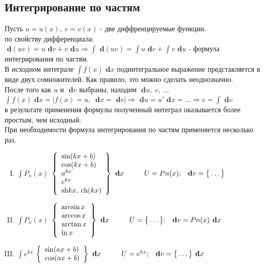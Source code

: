 \documentclass[a4paper,12pt, centered]{bookest}
\theoremstyle{remark}
\newcommand\tab[1][1cm]{\hspace*{#1}}
\newcommand\dx{\textbf{ d}x}
\newcommand\dy{\textbf{ d}}
\begin{document}
\subsection{Интегрирование по частям}
Пусть $u=u(x),\>v=v(x)$ - две диффренцируемые функции. \\
по свойству дифференциала:\\$\dy(uv)=u\dy v+v\dy u\Rightarrow\int \dy (uv)=\int u\dy v+\int v\dy u$ - формула интегрирования по частям.\\
В исходном интеграле $\int f(x)\dx$ подинтегральное выражение представляется в виде двух сомножителей. Как правило, это можно сделать неоднозначно.\\
После того как $u$ и $\dy v$ выбраны, находим $\dy u ,\>v,\>...$\\
$\int f(x)\dx = |f(x)=u,\>\dx=\dy v|\Rightarrow \dy u=u'\dx=...\Rightarrow v=\int \dy v$ \\
в результате применения формулы полученный интеграл оказывается более простым, чем исходный.\\
При необходимости формула интегрирования по частям применяется несколько раз.
\begin{enumerate}[I.]
	\item $\int P_n(x)$
		$\left\{\begin{array}{lr}
        \sin(kx+b)\\ \cos(kx+b)\\a^{kx}\\e^{kx}\\\textrm{sh}kx,\>\textrm{ch}(kx)
        \end{array}\right\}\dx\tab U=Pn(x);\>\>\dy v=\big\{\dots\big\}$
        \item $\int P_n(x)$
		$\left\{\begin{array}{lr}
        \arcsin x\\ \arccos x\\\arctan x\\\ln x\\
        \end{array}\right\}\dx\tab U=\big\{\dots\big\};\>\>\dy v=Pn(x)\dx$
        \item $\int e^{kx}$
		$\left\{\begin{array}{lr}
        \sin (ax+b)\\ \cos (ax+b)\end{array}\right\}\dx\tab U=e^{kx};\>\>\dy v=\big\{\dots\big\}\dx$
\end{enumerate}
\end{document}
